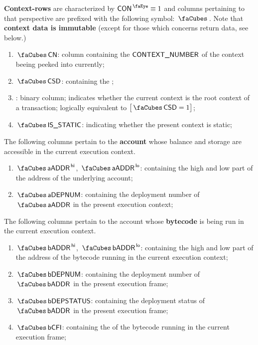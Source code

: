 \begin{center}
\end{center}
\textbf{Context-rows}\label{def: stack row} are characterized by $\peekContext \equiv 1$ and columns pertaining to that perspective are prefixed with the following symbol: $\contextSignifier$.
Note that \textbf{context data is immutable} (except for those which concerns return data, see below.)
\begin{enumerate}
	\item $\cnCn$:
		column containing the $\textsf{CONTEXT\_NUMBER}$ of the context beeing peeked into currently;
	\item  $\cnCsd$:
		\cncc{} containing the \CSD{};
	\item \cnIsRootContext{}:
		\cncc{} binary column; indicates whether the current context is the root context of a transaction; logically equivalent to $\big[ \cnCsd = 1 \big]$;
	\item $\cnStatic$:
		\cncbc{} indicating whether the present context is static;
\end{enumerate}
The following columns pertain to the \textbf{account} whose balance and storage are accessible in the current execution context.
\begin{enumerate}[resume]
	\item $\cnAccountAddress\high$, $\cnAccountAddress\low$:
		\cncc{} containing the high and low part of the address of the underlying account;
	\item $\cnAccDepNum$:
		\cncc{} containing the deployment number of $\cnAccountAddress$ in the present execution context;
\end{enumerate}
The following columns pertain to the account whose \textbf{bytecode} is being run in the current execution context.
\begin{enumerate}[resume]
	\item $\cnCodeAddress\high$, $\cnCodeAddress\low$:
		\cncc{} containing the high and low part of the address of the bytecode running in the current execution context;
	\item $\cnCodeDepNum$:
		\cncc{} containing the deployment number of $\cnCodeAddress$ in the present execution frame;
	\item $\cnCodeDepStatus$:
		\cncbc{} containing the deployment status of $\cnCodeAddress$ in the present execution frame;
	\item $\cnCodeCfi$:
		\cncc{} containing the \CFI{} of the bytecode running in the current execution frame;
\end{enumerate}
